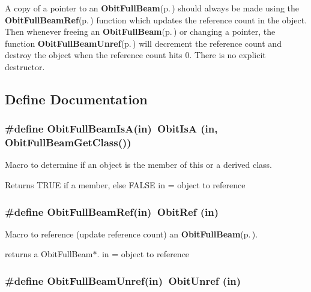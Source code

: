 A copy of a pointer to an {\bf Obit\-Full\-Beam}{\rm (p.\,\pageref{structObitFullBeam})} should always be made using the {\bf Obit\-Full\-Beam\-Ref}{\rm (p.\,\pageref{ObitFullBeam_8h_a1})} function which updates the reference count in the object. Then whenever freeing an {\bf Obit\-Full\-Beam}{\rm (p.\,\pageref{structObitFullBeam})} or changing a pointer, the function {\bf Obit\-Full\-Beam\-Unref}{\rm (p.\,\pageref{ObitFullBeam_8h_a0})} will decrement the reference count and destroy the object when the reference count hits 0. There is no explicit destructor.

\subsection{Define Documentation}
\subsubsection{\setlength{\rightskip}{0pt plus 5cm}\#define Obit\-Full\-Beam\-Is\-A(in)\ Obit\-Is\-A (in, Obit\-Full\-Beam\-Get\-Class())}\label{ObitFullBeam_8h_a2}


Macro to determine if an object is the member of this or a derived class. 

Returns TRUE if a member, else FALSE in = object to reference 
\subsubsection{\setlength{\rightskip}{0pt plus 5cm}\#define Obit\-Full\-Beam\-Ref(in)\ Obit\-Ref (in)}\label{ObitFullBeam_8h_a1}


Macro to reference (update reference count) an {\bf Obit\-Full\-Beam}{\rm (p.\,\pageref{structObitFullBeam})}. 

returns a Obit\-Full\-Beam$\ast$. in = object to reference 
\subsubsection{\setlength{\rightskip}{0pt plus 5cm}\#define Obit\-Full\-Beam\-Unref(in)\ Obit\-Unref (in)}\label{ObitFullBeam_8h_a0}


